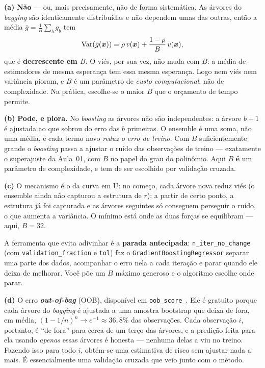 \documentclass[11pt,a4paper]{article}
\begin{document}
\begin{solucao}
\textbf{(a)} \textbf{Não} --- ou, mais precisamente, não de forma sistemática. As
árvores do \emph{bagging} são identicamente distribuídas e não dependem umas das
outras, então a média $\bar g=\frac1B\sum_b g_b$ tem
\[
  \operatorname{Var}(\bar g(\bm{x})) = \rho\,v(\bm{x}) + \frac{1-\rho}{B}\,v(\bm{x}),
\]
que é \textbf{decrescente em $B$}. O viés, por sua vez, não muda com $B$: a média
de estimadores de mesma esperança tem essa mesma esperança. Logo nem viés nem
variância pioram, e $B$ é um parâmetro de \emph{custo computacional}, não de
complexidade. Na prática, escolhe-se o maior $B$ que o orçamento de tempo
permite.

\smallskip
\textbf{(b)} \textbf{Pode, e piora.} No \emph{boosting} as árvores não são
independentes: a árvore $b+1$ é ajustada ao que sobrou do erro das $b$ primeiras.
O ensemble é uma soma, não uma média, e cada termo novo \emph{reduz o erro de
treino}. Com $B$ suficientemente grande o \emph{boosting} passa a ajustar o ruído
das observações de treino --- exatamente o superajuste da Aula~01, com $B$ no
papel do grau do polinômio. Aqui $B$ \textbf{é} um parâmetro de complexidade, e
tem de ser escolhido por validação cruzada.

\smallskip
\textbf{(c)} O mecanismo é o da curva em U: no começo, cada árvore nova reduz
viés (o ensemble ainda não capturou a estrutura de $r$); a partir de certo ponto,
a estrutura já foi capturada e as árvores seguintes só conseguem perseguir o
ruído, o que aumenta a variância. O mínimo está onde as duas forças se equilibram
--- aqui, $B=32$.

A ferramenta que evita adivinhar é a \textbf{parada antecipada}:
\texttt{n\_iter\_no\_change} (com \texttt{validation\_fraction} e \texttt{tol}) faz
o \texttt{GradientBoostingRegressor} separar uma parte dos dados, acompanhar o
erro nela a cada iteração e parar quando ele deixa de melhorar. Você põe um $B$
máximo generoso e o algoritmo escolhe onde parar.

\smallskip
\textbf{(d)} O erro \textbf{\emph{out-of-bag}} (OOB), disponível em
\texttt{oob\_score\_}. Ele é gratuito porque cada árvore do \emph{bagging} é
ajustada a uma amostra bootstrap que deixa de fora, em média, $(1-1/n)^n\to
e^{-1}\approx 36{,}8\%$ das observações. Cada observação $i$, portanto, é ``de
fora'' para cerca de um terço das árvores, e a predição feita para ela usando
\emph{apenas} essas árvores é honesta --- nenhuma delas a viu no treino. Fazendo
isso para todo $i$, obtém-se uma estimativa de risco sem ajustar nada a mais.
É essencialmente uma validação cruzada que veio junto com o método.
\end{solucao}
\end{document}
